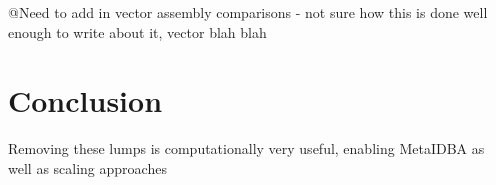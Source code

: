 \documentclass[11pt]{article} %
\begin{document}
@Need to add in vector assembly comparisons - not sure how this is done well enough to write about it, vector blah blah

\section{Conclusion}
Removing these lumps is computationally very useful, enabling MetaIDBA as well as scaling approaches



\end{document}
